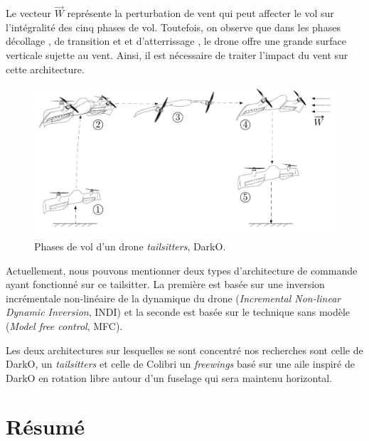 Le vecteur $\overrightarrow{W}$ représente la perturbation de vent qui peut affecter le vol sur l'intégralité des cinq phases de vol. Toutefois, on observe que dans les phases décollage , de transition  et  et d'atterrissage , le drone offre une grande surface verticale sujette au vent. Ainsi, il est nécessaire de traiter l'impact du vent sur cette architecture.

\begin{figure}[ht!]
    \centering
        \includegraphics[width=0.8\columnwidth]{figures/darko_transition.png}
        \caption{Phases de vol d'un drone \textit{tailsitters}, DarkO.}
        \label{fig:darko_flight}
\end{figure}

Actuellement, nous pouvons mentionner deux types d'architecture de commande ayant fonctionné sur ce tailsitter. La première est basée sur une inversion incrémentale non-linéaire de la dynamique du drone (\textit{Incremental Non-linear Dynamic Inversion}, INDI)  et la seconde est basée sur le technique sans modèle (\textit{Model free control}, MFC). 

Les deux architectures sur lesquelles se sont concentré nos recherches sont celle de DarkO, un \textit{tailsitters} et celle de Colibri un \textit{freewings} basé sur une aile inspiré de DarkO en rotation libre autour d'un fuselage qui sera maintenu horizontal.





\section{Résumé}